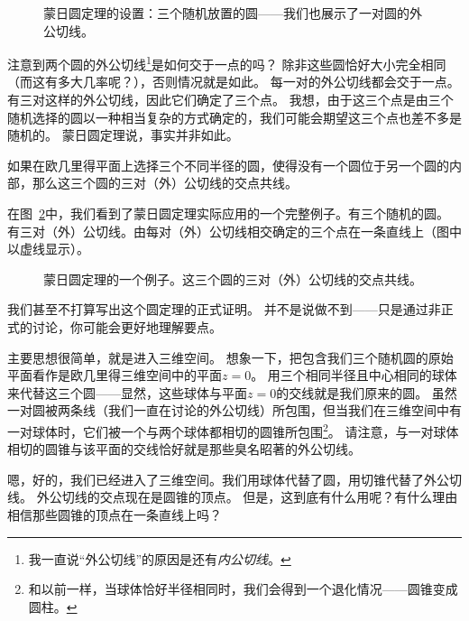 \begin{figure}[!hbtp] 
\begin{center}

\end{center}
\caption[蒙日圆定理的设置。]{蒙日圆定理的设置：三个随机放置的圆——我们也展示了一对圆的外公切线。}
\label{fig:monge1}
\end{figure}

注意到两个圆的外公切线\footnote{我一直说“外公切线”的原因是还有\emph{内公切线}。}是如何交于一点的吗？
除非这些圆恰好大小完全相同（而这有多大几率呢？），否则情况就是如此。
每一对的外公切线都会交于一点。
有三对这样的外公切线，因此它们确定了三个点。
我想，由于这三个点是由三个随机选择的圆以一种相当复杂的方式确定的，我们可能会期望这三个点也差不多是随机的。
蒙日圆定理说，事实并非如此。

\begin{thm}[蒙日圆定理]
如果在欧几里得平面上选择三个不同半径的圆，使得没有一个圆位于另一个圆的内部，那么这三个圆的三对（外）公切线的交点共线。
\end{thm}

在图~\ref{fig:monge2}中，我们看到了蒙日圆定理实际应用的一个完整例子。有三个随机的圆。
有三对（外）公切线。由每对（外）公切线相交确定的三个点在一条直线上（图中以虚线显示）。

\begin{figure}[!hbtp] 
\begin{center}

\end{center}
\caption[蒙日圆定理的例子。]{蒙日圆定理的一个例子。这三个圆的三对（外）公切线的交点共线。}
\label{fig:monge2}
\end{figure}
 
我们甚至不打算写出这个圆定理的正式证明。
并不是说做不到——只是通过非正式的讨论，你可能会更好地理解要点。

主要思想很简单，就是进入三维空间。
想象一下，把包含我们三个随机圆的原始平面看作是欧几里得三维空间中的平面$z=0$。
用三个相同半径且中心相同的球体来代替这三个圆——显然，这些球体与平面$z=0$的交线就是我们原来的圆。
虽然一对圆被两条线（我们一直在讨论的外公切线）所包围，但当我们在三维空间中有一对球体时，它们被一个与两个球体都相切的圆锥所包围\footnote{和以前一样，当球体恰好半径相同时，我们会得到一个退化情况——圆锥变成圆柱。}。
请注意，与一对球体相切的圆锥与该平面的交线恰好就是那些臭名昭著的外公切线。

嗯，好的，我们已经进入了三维空间。我们用球体代替了圆，用切锥代替了外公切线。
外公切线的交点现在是圆锥的顶点。
但是，这到底有什么用呢？有什么理由相信那些圆锥的顶点在一条直线上吗？

